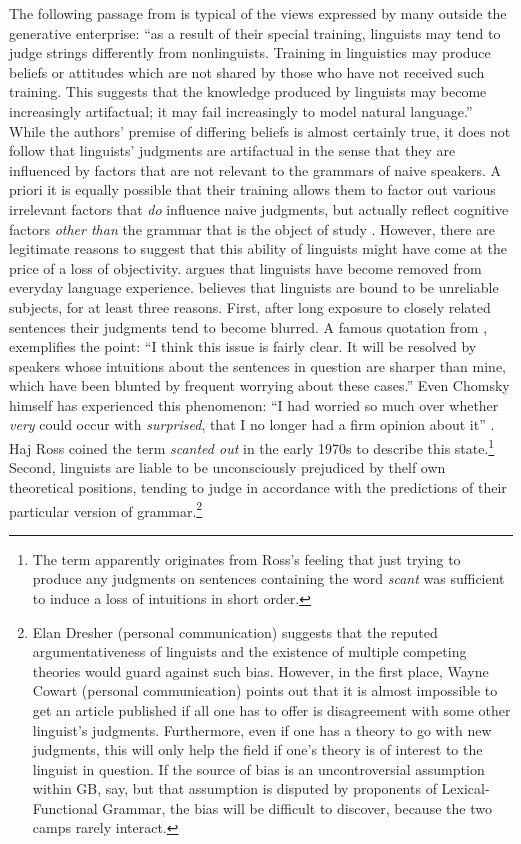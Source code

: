 The following passage from \citet[968]{BradacEtAl1980} is typical of the views expressed by many outside the generative enterprise: ``as a result of their special training, linguists may tend to judge strings differently from nonlinguists. Training in linguistics may produce beliefs or attitudes which are not shared by those who have not received such training. This suggests that the knowledge produced by linguists may become increasingly artifactual; it may fail increasingly to model natural language.'' While the authors' premise of differing beliefs is almost certainly true, it does not follow that linguists' judgments are artifactual in the sense that they are influenced by factors that are not relevant to the grammars of naive speakers. A priori it is equally possible that their training allows them to factor out various irrelevant factors that \textit{do} influence naive judgments, but actually reflect cognitive factors \textit{other than} the grammar that is the object of study \citep{Levelt1974}. However, there are legitimate reasons to suggest that this ability of linguists might have come at the price of a loss of objectivity. \citet{Labov1972a} argues that linguists have become removed from everyday language experience. \citet{Greenbaum1976a,Greenbaum1977c} believes that linguists are bound to be unreliable subjects, for at least three reasons. First, after long exposure to closely related sentences their judgments tend to become blurred. A famous quotation from \citet[178]{Fraser1971}, exemplifies the point: ``I think this issue is fairly clear. It will be resolved by speakers whose intuitions about the sentences in question are sharper than mine, which have been blunted by frequent worrying about these cases.'' Even Chomsky himself has experienced this phenomenon: ``I had worried so much over whether \textit{very} could occur with \textit{surprised}, that I no longer had a firm opinion about it'' \citep[172]{Chomsky1962}. Haj Ross coined the term \textit{scanted out} in the early 1970s to describe this state.\footnote{The term apparently originates from Ross's feeling that just trying to produce any judgments on sentences containing the word \textit{scant} was sufficient to induce a loss of intuitions in short order.}
Second, linguists are liable to be unconsciously prejudiced by thelf own theoretical positions, tending to judge in accordance with the predictions of their particular version of grammar.\footnote{Elan Dresher (personal communication) suggests that the reputed argumentativeness of linguists and the existence of multiple competing theories would guard against such bias. However, in the first place, Wayne Cowart (personal communication) points out that it is almost impossible to get 
an article published if all one has to offer is disagreement with some other linguist's judgments. Furthermore, even if one has a theory to go with new judgments, this will only help the field if one's theory is of interest to the linguist in question. If the source of bias is an uncontroversial assumption within GB, say, but that assumption is disputed by proponents of Lexical-Functional Grammar, the bias will be difficult to discover, because the two camps rarely interact.}
